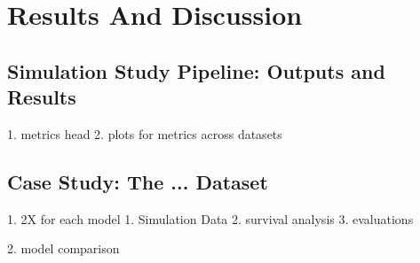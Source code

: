 \chapter{Results And Discussion}
\label{Chapter4}


\section{Simulation Study Pipeline: Outputs and Results}

1. metrics head
2. plots for metrics across datasets



\section{Case Study: The ... Dataset}

1. 2X for each model
{
    1. Simulation Data
    2. survival analysis
    3. evaluations
}

2. model comparison 


